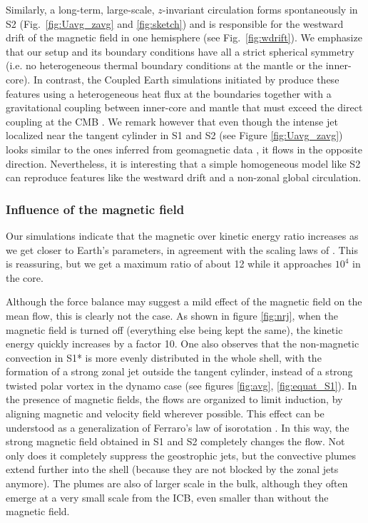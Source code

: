 \documentclass[12pt, a4paper]{article}
\begin{document}
Similarly, a long-term, large-scale, $z$-invariant circulation forms spontaneously in S2 (Fig.~\ref{fig:Uavg_zavg} and \ref{fig:sketch}) and is responsible for the westward drift of the magnetic field in one hemisphere (see Fig.~\ref{fig:wdrift}).
We emphasize that our setup and its boundary conditions have all a strict spherical symmetry (i.e. no heterogeneous thermal boundary conditions at the mantle or the inner-core).
In contrast, the Coupled Earth simulations initiated by \citet{aubert2013CE} produce these features using a heterogeneous heat flux at the boundaries together with a gravitational coupling between inner-core and mantle that must exceed the direct coupling at the CMB \citep[see detailed analysis by][]{pichon2016}.
We remark however that even though the intense jet localized near the tangent cylinder in S1 and S2 (see Figure \ref{fig:Uavg_zavg}) looks similar to the ones inferred from geomagnetic data \citep[e.g.][]{pais2008,schaeffer2011,pais2015,gillet2015,livermore2016}, it flows in the opposite direction.
Nevertheless, it is interesting that a simple homogeneous model like S2 can reproduce features like the westward drift and a non-zonal global circulation.

\subsubsection{Influence of the magnetic field}		\label{sec:infmag}
Our simulations indicate that the magnetic over kinetic energy ratio increases as we get closer to Earth's parameters, in agreement with the scaling laws of \citet{christensen2006}.
This is reassuring, but we get a maximum ratio of about 12 while it approaches $10^4$ in the core.

Although the force balance may suggest a mild effect of the magnetic field on the mean flow, this is clearly not the case.
As shown in figure \ref{fig:nrj}, when the magnetic field is turned off (everything else being kept the same), the kinetic energy quickly increases by a factor 10.
One also observes that the non-magnetic convection in S1* is more evenly distributed in the whole shell, with the formation of a strong zonal jet outside the tangent cylinder, instead of a strong twisted polar vortex in the dynamo case (see figures \ref{fig:avg}, \ref{fig:equat_S1}).
In the presence of magnetic fields, the flows are organized to limit induction, by aligning magnetic and velocity field wherever possible.
This effect can be understood as a generalization of Ferraro's law of isorotation \citep{aubert2005}.
In this way, the strong magnetic field obtained in S1 and S2 completely changes the flow.
Not only does it completely suppress the geostrophic jets, but the convective plumes extend further into the shell (because they are not blocked by the zonal jets anymore).
The plumes are also of larger scale in the bulk, although they often emerge at a very small scale from the ICB, even smaller than without the magnetic field.
\end{document}
